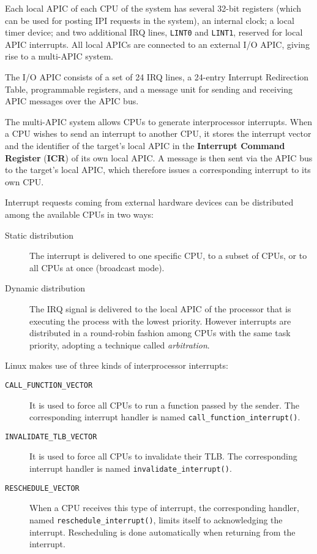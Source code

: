 \documentclass[10pt,a4paper]{article}
\begin{document}
Each local APIC of each CPU of the system has several 32-bit registers (which can be used for posting IPI requests in the system), an internal clock; a local timer device; and two additional IRQ lines, \texttt{LINT0} and \texttt{LINT1}, reserved for local APIC interrupts. All local APICs are connected to an external I/O APIC, giving rise to a multi-APIC system.

The I/O APIC consists of a set of 24 IRQ lines, a 24-entry Interrupt Redirection Table, programmable registers, and a message unit for sending and receiving APIC messages over the APIC bus.

The multi-APIC system allows CPUs to generate interprocessor interrupts. When a CPU wishes to send an interrupt to another CPU, it stores the interrupt vector and the identifier of the target's local APIC in the \textbf{Interrupt Command Register} (\textbf{ICR}) of its own local APIC. A message is then sent via the APIC bus to the target's local APIC, which therefore issues a corresponding interrupt to its own CPU. 

Interrupt requests coming from external hardware devices can be distributed among the available CPUs in two ways:
\begin{description}
\item[Static distribution] The interrupt is delivered to one specific CPU, to a subset of CPUs, or to all CPUs at once (broadcast mode).
\item[Dynamic distribution] The IRQ signal is delivered to the local APIC of the processor that is executing the process with the lowest priority. However interrupts are distributed in a round-robin fashion among CPUs with the same task priority, adopting a technique called \textit{arbitration}.
\end{description}



Linux makes use of three kinds of interprocessor interrupts:

\begin{description}
\item[\texttt{CALL\_FUNCTION\_VECTOR}] It is used to force all CPUs to run a function passed by the sender. The corresponding interrupt handler is named \texttt{call\_function\_interrupt()}. 
\item[\texttt{INVALIDATE\_TLB\_VECTOR}] It is used to force all CPUs to invalidate their TLB. The corresponding interrupt handler is named \texttt{invalidate\_interrupt()}. 
\item[\texttt{RESCHEDULE\_VECTOR}] When a CPU receives this type of interrupt, the corresponding handler, named \texttt{reschedule\_interrupt()}, limits itself to acknowledging the interrupt. Rescheduling is done automatically when returning from the interrupt.
\end{description}
\end{document}
